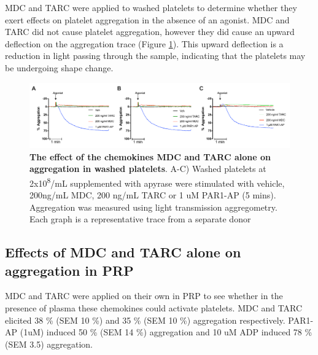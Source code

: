 \documentclass[11pt,twoside]{bristolthesis}
\begin{document}
MDC and TARC were applied to washed platelets to determine whether they exert effects on platelet aggregation in the absence of an agonist. MDC and TARC did not cause platelet aggregation, however they did cause an upward deflection on the aggregation trace (Figure \ref{fig:MDC-TARC-wp-alone-aggregation}). This upward deflection is a reduction in light passing through the sample, indicating that the platelets may be undergoing shape change.



\begin{figure}

{\centering \includegraphics[width=1\linewidth]{figure/Chemokines/Layouts/MDC_TARC_alone_wp_aggregation} 

}

\caption[The effect of the chemokines MDC and TARC alone on aggregation in washed platelets]{\textbf{The effect of the chemokines MDC and TARC alone on aggregation in washed platelets}. A-C) Washed platelets at 2x10\textsuperscript{8}/mL supplemented with apyrase were stimulated with vehicle, 200ng/mL MDC, 200 ng/mL TARC or 1 uM PAR1-AP (5 mins). Aggregation was measured using light transmission aggregometry. Each graph is a representative trace from a separate donor}\label{fig:MDC-TARC-wp-alone-aggregation}
\end{figure}
\hypertarget{effects-of-mdc-and-tarc-alone-on-aggregation-in-prp}{%
\subsection{Effects of MDC and TARC alone on aggregation in PRP}\label{effects-of-mdc-and-tarc-alone-on-aggregation-in-prp}}

MDC and TARC were applied on their own in PRP to see whether in the presence of plasma these chemokines could activate platelets. MDC and TARC elicited 38 \% (SEM 10 \%) and 35 \% (SEM 10 \%) aggregation respectively. PAR1-AP (1uM) induced 50 \% (SEM 14 \%) aggregation and 10 uM ADP induced 78 \% (SEM 3.5) aggregation.
\end{document}
